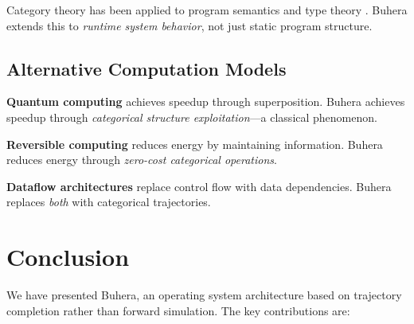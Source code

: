 \documentclass[twocolumn,10pt]{article}
\theoremstyle{definition}
\theoremstyle{remark}
\begin{document}
Category theory has been applied to program semantics \citep{barr1990category} and type theory \citep{awodey2010category}. Buhera extends this to \emph{runtime system behavior}, not just static program structure.

\subsection{Alternative Computation Models}

\textbf{Quantum computing} \citep{nielsen2010} achieves speedup through superposition. Buhera achieves speedup through \emph{categorical structure exploitation}—a classical phenomenon.

\textbf{Reversible computing} \citep{bennett1973} reduces energy by maintaining information. Buhera reduces energy through \emph{zero-cost categorical operations}.

\textbf{Dataflow architectures} \citep{dennis1980dataflow} replace control flow with data dependencies. Buhera replaces \emph{both} with categorical trajectories.

\section{Conclusion}
\label{sec:conclusion}

We have presented Buhera, an operating system architecture based on trajectory completion rather than forward simulation. The key contributions are:
\end{document}
